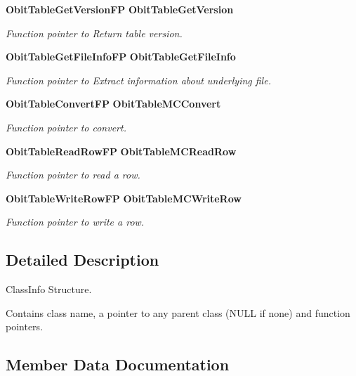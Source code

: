 \begin{CompactItemize}
{\bf Obit\-Table\-Get\-Version\-FP} {\bf Obit\-Table\-Get\-Version}
\begin{CompactList}\small\item\em Function pointer to Return table version. \item\end{CompactList}\item 
{\bf Obit\-Table\-Get\-File\-Info\-FP} {\bf Obit\-Table\-Get\-File\-Info}
\begin{CompactList}\small\item\em Function pointer to Extract information about underlying file. \item\end{CompactList}\item 
{\bf Obit\-Table\-Convert\-FP} {\bf Obit\-Table\-MCConvert}
\begin{CompactList}\small\item\em Function pointer to convert. \item\end{CompactList}\item 
{\bf Obit\-Table\-Read\-Row\-FP} {\bf Obit\-Table\-MCRead\-Row}
\begin{CompactList}\small\item\em Function pointer to read a row. \item\end{CompactList}\item 
{\bf Obit\-Table\-Write\-Row\-FP} {\bf Obit\-Table\-MCWrite\-Row}
\begin{CompactList}\small\item\em Function pointer to write a row. \item\end{CompactList}\end{CompactItemize}


\subsection{Detailed Description}
Class\-Info Structure. 

Contains class name, a pointer to any parent class (NULL if none) and function pointers. 



\subsection{Member Data Documentation}
